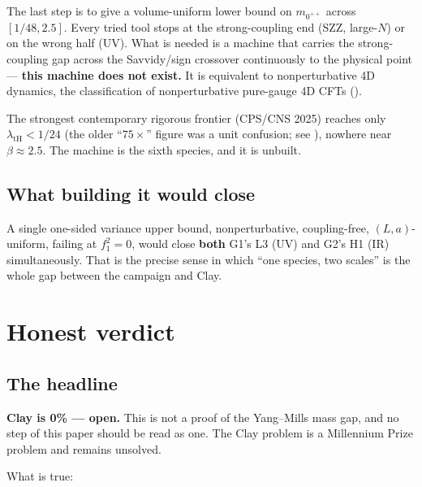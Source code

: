 \begin{qbox}
The last step is to give a volume-uniform lower bound on $m_{0^{++}}$ across $[1/48,2.5]$. Every
tried tool stops at the strong-coupling end (SZZ, large-$N$) or on the wrong half (UV). What is
needed is a machine that carries the strong-coupling gap across the Savvidy/sign crossover
continuously to the physical point --- \textbf{this machine does not exist.} It is equivalent to
nonperturbative 4D dynamics, the classification of nonperturbative pure-gauge 4D CFTs
().
\end{qbox}

The strongest contemporary rigorous frontier (CPS/CNS 2025) reaches only $\lambda_{\mathrm{tH}}<1/24$ (the older
``$75\times$'' figure was a unit confusion; see ), nowhere near
$\beta\approx2.5$. The machine is the sixth species, and it is unbuilt.

\subsection{What building it would close}

A single one-sided variance upper bound, nonperturbative, coupling-free, $(L,a)$-uniform, failing
at $f_1^2=0$, would close \textbf{both} G1's L3 (UV) and G2's H1 (IR) simultaneously. That is the
precise sense in which ``one species, two scales'' is the whole gap between the campaign and
Clay.

\section{Honest verdict}
\label{sec:verdict}

\subsection{The headline}

\textbf{Clay is 0\% --- open.} This is not a proof of the Yang--Mills mass gap, and no step of
this paper should be read as one. The Clay problem is a Millennium Prize problem and remains
unsolved.

What is true:

